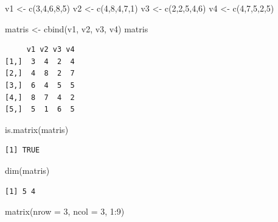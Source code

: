 \documentclass[
  letterpaper,
  DIV=11,
  numbers=noendperiod]{scrreprt}
\newenvironment{Shaded}{\begin{snugshade}}{\end{snugshade}}
\newcommand{\AttributeTok}[1]{\textcolor[rgb]{0.40,0.45,0.13}{#1}}
\newcommand{\DecValTok}[1]{\textcolor[rgb]{0.68,0.00,0.00}{#1}}
\newcommand{\FunctionTok}[1]{\textcolor[rgb]{0.28,0.35,0.67}{#1}}
\newcommand{\NormalTok}[1]{\textcolor[rgb]{0.00,0.23,0.31}{#1}}
\newcommand{\OtherTok}[1]{\textcolor[rgb]{0.00,0.23,0.31}{#1}}
\newcommand{\SpecialCharTok}[1]{\textcolor[rgb]{0.37,0.37,0.37}{#1}}
\begin{document}
\begin{Shaded}
\begin{Highlighting}[]
\NormalTok{v1 }\OtherTok{\textless{}{-}} \FunctionTok{c}\NormalTok{(}\DecValTok{3}\NormalTok{,}\DecValTok{4}\NormalTok{,}\DecValTok{6}\NormalTok{,}\DecValTok{8}\NormalTok{,}\DecValTok{5}\NormalTok{)}
\NormalTok{v2 }\OtherTok{\textless{}{-}} \FunctionTok{c}\NormalTok{(}\DecValTok{4}\NormalTok{,}\DecValTok{8}\NormalTok{,}\DecValTok{4}\NormalTok{,}\DecValTok{7}\NormalTok{,}\DecValTok{1}\NormalTok{)}
\NormalTok{v3 }\OtherTok{\textless{}{-}} \FunctionTok{c}\NormalTok{(}\DecValTok{2}\NormalTok{,}\DecValTok{2}\NormalTok{,}\DecValTok{5}\NormalTok{,}\DecValTok{4}\NormalTok{,}\DecValTok{6}\NormalTok{)}
\NormalTok{v4 }\OtherTok{\textless{}{-}} \FunctionTok{c}\NormalTok{(}\DecValTok{4}\NormalTok{,}\DecValTok{7}\NormalTok{,}\DecValTok{5}\NormalTok{,}\DecValTok{2}\NormalTok{,}\DecValTok{5}\NormalTok{)}

\NormalTok{matris }\OtherTok{\textless{}{-}} \FunctionTok{cbind}\NormalTok{(v1, v2, v3, v4)}
\NormalTok{matris}
\end{Highlighting}
\end{Shaded}

\begin{verbatim}
     v1 v2 v3 v4
[1,]  3  4  2  4
[2,]  4  8  2  7
[3,]  6  4  5  5
[4,]  8  7  4  2
[5,]  5  1  6  5
\end{verbatim}

\begin{Shaded}
\begin{Highlighting}[]
\FunctionTok{is.matrix}\NormalTok{(matris)}
\end{Highlighting}
\end{Shaded}

\begin{verbatim}
[1] TRUE
\end{verbatim}

\begin{Shaded}
\begin{Highlighting}[]
\FunctionTok{dim}\NormalTok{(matris)}
\end{Highlighting}
\end{Shaded}

\begin{verbatim}
[1] 5 4
\end{verbatim}

\begin{Shaded}
\begin{Highlighting}[]
\FunctionTok{matrix}\NormalTok{(}\AttributeTok{nrow =} \DecValTok{3}\NormalTok{, }\AttributeTok{ncol =} \DecValTok{3}\NormalTok{, }\DecValTok{1}\SpecialCharTok{:}\DecValTok{9}\NormalTok{)}
\end{Highlighting}
\end{Shaded}
\end{document}

